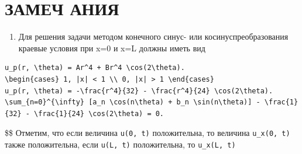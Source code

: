 \documentclass[
  ukrainian,
]{article}
\providecommand{\tightlist}{%
  \setlength{\itemsep}{0pt}\setlength{\parskip}{0pt}}
\begin{document}
\section{ЗАМЕЧ
АНИЯ}\label{ux437ux430ux43cux435ux447-ux430ux43dux438ux44f}

\begin{enumerate}
\def\labelenumi{\arabic{enumi}.}
\tightlist
\item
  Для решения задачи методом конечного синус- или косинуспреобразования
  краевые условия при x=0 и x=L должны иметь вид
\end{enumerate}

\begin{verbatim}
u_p(r, \theta) = Ar^4 + Br^4 \cos(2\theta).
\begin{cases} 1, |x| < 1 \\ 0, |x| > 1 \end{cases}
u_p(r, \theta) = -\frac{r^4}{32} - \frac{r^4}{24} \cos(2\theta).
\sum_{n=0}^{\infty} [a_n \cos(n\theta) + b_n \sin(n\theta)] - \frac{1}{32} - \frac{1}{24} \cos(2\theta) = 0.
\end{verbatim}

\$\$ Отметим, что если величина \texttt{u(0,\ t)} положительна, то
величина \texttt{u\_x(0,\ t)} также положительна, если \texttt{u(L,\ t)}
положительна, то \texttt{u\_x(L,\ t)}
\end{document}
